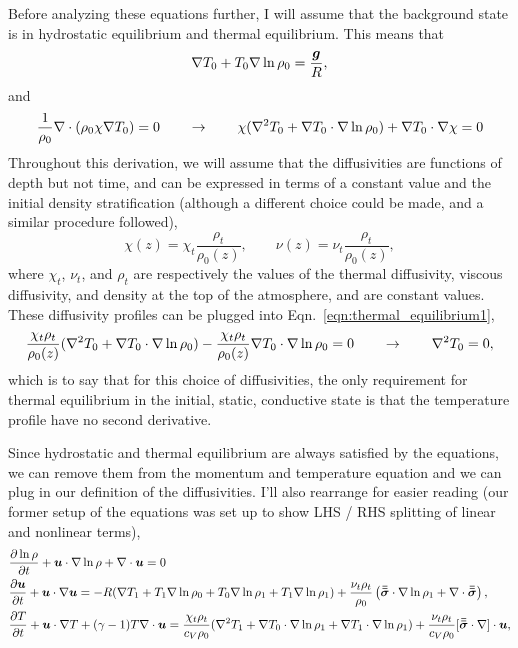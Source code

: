 Before analyzing these equations further, I will assume that the background state is in hydrostatic equilibrium and thermal equilibrium.
This means that
\begin{equation}
\nabla T_0 + T_0\nabla\ln\rho_0 = \frac{\bm{g}}{R},
\label{eqn:hydrostatic_equilibrium1}
\end{equation}
and
\begin{equation}
\frac{1}{\rho_0}\nabla\cdot(\rho_0\chi\nabla T_0) = 0 \qquad\rightarrow\qquad
\chi (\nabla^2 T_0 + \nabla T_0 \cdot\nabla\ln\rho_0) + \nabla T_0 \cdot\nabla\chi  = 0
\label{eqn:thermal_equilibrium1}
\end{equation}
Throughout this derivation, we will assume that the diffusivities are functions of depth but not time, and can be expressed in terms of a constant value and the initial density stratification (although a different choice could be made, and a similar procedure followed),
$$
\chi(z) = \chi_t \frac{\rho_t}{\rho_0(z)}, \qquad
\nu(z)  = \nu_t  \frac{\rho_t}{\rho_0(z)},
$$
where $\chi_t$, $\nu_t$, and $\rho_t$ are respectively the values of the thermal diffusivity, viscous diffusivity, and density at the top of the atmosphere, and are constant values.
These diffusivity profiles can be plugged into Eqn.~\ref{eqn:thermal_equilibrium1},
$$
\frac{\chi_t\rho_t}{\rho_0(z)}(\nabla^2 T_0 + \nabla T_0 \cdot \nabla\ln\rho_0) - \frac{\chi_t\rho_t}{\rho_0(z)}\nabla T_0 \cdot\nabla\ln\rho_0 = 0
\qquad\rightarrow\qquad
\nabla^2 T_0 = 0,
$$
which is to say that for this choice of diffusivities, the only requirement for thermal equilibrium in the initial, static, conductive state is that the temperature profile have no second derivative.

Since hydrostatic and thermal equilibrium are always satisfied by the equations, we can remove them from the momentum and temperature equation and we can plug in our definition of the diffusivities.
I'll also rearrange for easier reading (our former setup of the equations was set up to show LHS / RHS splitting of linear and nonlinear terms),
\begin{align}
&\begin{aligned}
&\frac{\partial \ln\rho}{\partial t} + \bm{u}\cdot\nabla\ln\rho + \nabla\cdot\bm{u}  = 0
	\label{eqn:ab17continuity_eqn2}
\end{aligned}\\
&\begin{aligned}
\frac{\partial\bm{u}}{\partial t} + \bm{u}\cdot\nabla\bm{u}
&= - R (\nabla T_1 + T_1\nabla\ln\rho_0 + T_0\nabla\ln\rho_1 + T_1 \nabla\ln\rho_1)
+ \frac{\nu_t\rho_t}{\rho_0}\left(\bm{\bar{\bar{\sigma}}}\cdot\nabla\ln\rho_1 + \nabla\cdot\bm{\bar{\bar{\sigma}}}\right),
\label{eqn:ab17momentum_eqn2}
\end{aligned}\\
&\begin{aligned}
\frac{\partial T}{\partial t} + \bm{u}\cdot\nabla T + (\gamma-1)T\nabla\cdot\bm{u}
=	\frac{\chi_t\rho_t}{c_V\rho_0}(\nabla^2 T_1 + \nabla T_0\cdot\nabla\ln\rho_1 + \nabla T_1\cdot\nabla\ln\rho_1)
	+ \frac{\nu_t\rho_t }{c_V\rho_0}[\bm{\bar{\bar{\sigma}}}\cdot\nabla]\cdot\bm{u}, 
	\label{eqn:ab17energy_eqn2}
\end{aligned}
\end{align}

